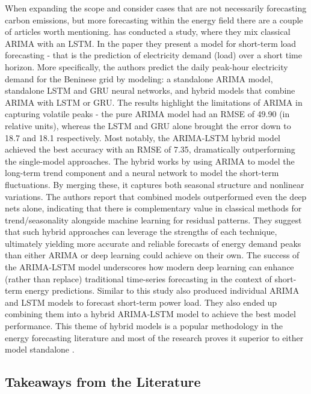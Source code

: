 When expanding the scope and consider cases that are not necessarily forecasting carbon emissions, but more forecasting within the energy field there are a couple of articles worth mentioning. \textcite{pierre2023} has conducted a study, where they mix classical ARIMA with an LSTM. In the paper  they present a model for short-term load forecasting - that is the prediction of electricity demand (load) over a short time horizon. More specifically, the authors predict the daily peak-hour electricity demand for the Beninese grid by modeling: a standalone ARIMA model, standalone LSTM and GRU neural networks, and hybrid models that combine ARIMA with LSTM or GRU. The results highlight the limitations of ARIMA in capturing volatile peaks - the pure ARIMA model had an RMSE of 49.90 (in relative units), whereas the LSTM and GRU alone brought the error down to 18.7 and 18.1 respectively. Most notably, the ARIMA-LSTM hybrid model achieved the best accuracy with an RMSE of 7.35, dramatically outperforming the single-model approaches. The hybrid works by using ARIMA to model the long-term trend component and a neural network to model the short-term fluctuations. By merging these, it captures both seasonal structure and nonlinear variations. The authors report that combined models outperformed even the deep nets alone, indicating that there is complementary value in classical methods for trend/seasonality alongside machine learning for residual patterns. They suggest that such hybrid approaches can leverage the strengths of each technique, ultimately yielding more accurate and reliable forecasts of energy demand peaks than either ARIMA or deep learning could achieve on their own. The success of the ARIMA-LSTM model underscores how modern deep learning can enhance (rather than replace) traditional time-series forecasting in the context of short-term energy predictions. Similar to this study \textcite{zhang2024} also produced individual ARIMA and LSTM models to forecast short-term power load. They also ended up combining them into a hybrid ARIMA-LSTM model to achieve the best model performance. This theme of hybrid models is a popular methodology in the energy forecasting literature and most of the research proves it superior to either model standalone \parencite{semmelmann2022, arslan2022, bashir2022, grandon2023}.

\subsection{Takeaways from the Literature}

